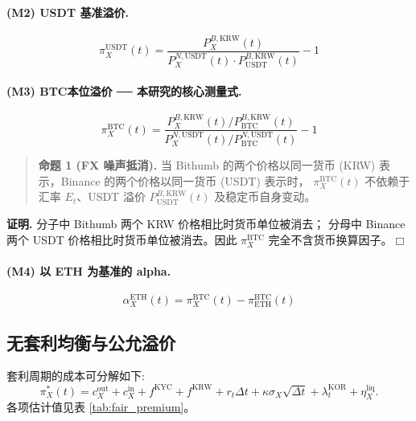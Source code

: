 \documentclass[11pt,a4paper]{article}
\begin{document}
\paragraph{(M2) USDT 基准溢价.}
\begin{equation}
\pi^{\text{USDT}}_X(t) = \frac{P_X^{B,\text{KRW}}(t)}{P_X^{N,\text{USDT}}(t)\cdot P_{\text{USDT}}^{B,\text{KRW}}(t)}-1
\label{eq:pi_usdt}
\end{equation}

\paragraph{(M3) BTC本位溢价 ── 本研究的核心测量式.}
\begin{equation}
\boxed{\;
\pi^{\text{BTC}}_X(t) = \frac{P_X^{B,\text{KRW}}(t)/P_{\text{BTC}}^{B,\text{KRW}}(t)}
                                {P_X^{N,\text{USDT}}(t)/P_{\text{BTC}}^{N,\text{USDT}}(t)} - 1
\;}
\label{eq:pi_btc}
\end{equation}

\begin{quote}
\textbf{命题 1 (FX 噪声抵消).}
当 Bithumb 的两个价格以同一货币 (KRW) 表示，Binance 的两个价格以同一货币 (USDT) 表示时，
$\pi^{\text{BTC}}_X(t)$ 不依赖于汇率 $E_t$、USDT 溢价 $P_{\text{USDT}}^{B,\text{KRW}}(t)$
及稳定币自身变动。
\end{quote}

\noindent\textbf{证明.} 分子中 Bithumb 两个 KRW 价格相比时货币单位被消去；
分母中 Binance 两个 USDT 价格相比时货币单位被消去。因此 $\pi^{\text{BTC}}_X$ 完全不含货币换算因子。\hfill$\Box$

\paragraph{(M4) 以 ETH 为基准的 alpha.}
\begin{equation}
\alpha_X^{\text{ETH}}(t) = \pi^{\text{BTC}}_X(t) - \pi^{\text{BTC}}_{\text{ETH}}(t)
\label{eq:alpha}
\end{equation}

\subsection{无套利均衡与公允溢价}
套利周期的成本可分解如下:
\begin{equation}
\pi^*_X(t) = c_X^{\text{out}}+c_X^{\text{in}} + f^{\text{KYC}}+f^{\text{KRW}}
           + r_t\Delta t + \kappa\sigma_X\sqrt{\Delta t}
           + \lambda_t^{\text{KOR}} + \eta_X^{\text{liq}}.
\label{eq:fair_premium}
\end{equation}
各项估计值见表 \ref{tab:fair_premium}。
\end{document}
